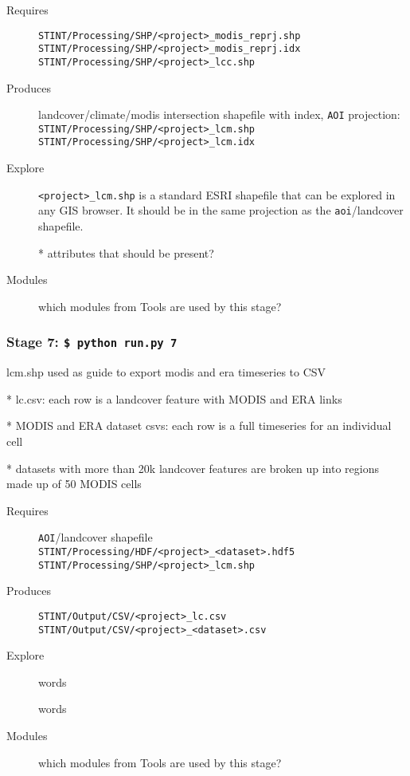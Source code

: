 \documentclass[twoside,a4paper]{refart}
\begin{document}
  \begin{description}
    \item [Requires]
      \texttt{STINT/Processing/SHP/<project>\_modis\_reprj.shp} \\
      \texttt{STINT/Processing/SHP/<project>\_modis\_reprj.idx} \\
      \texttt{STINT/Processing/SHP/<project>\_lcc.shp}
  
  
    \item [Produces]
      landcover/climate/modis intersection shapefile with index, 
      \texttt{AOI} projection:\\
      \texttt{STINT/Processing/SHP/<project>\_lcm.shp}\\
      \texttt{STINT/Processing/SHP/<project>\_lcm.idx}
      

    \item [Explore]
      \texttt{<project>\_lcm.shp} is a standard ESRI shapefile that can be explored in any GIS browser.  It should be in the same projection as the \texttt{aoi}/landcover shapefile.
      
      * attributes that should be present?

    \item [Modules]
      which modules from Tools are used by this stage?
  \end{description}


\subsubsection{\textbf{Stage 7:} \texttt{\$ python run.py 7}}
      lcm.shp used as guide to export modis and era timeseries to CSV
      
        * lc.csv: each row is a landcover feature with MODIS and ERA links
        
        * MODIS and ERA dataset csvs: each row is a full timeseries for an
          individual cell
          
        * datasets with more than 20k landcover features are broken up into
          regions made up of 50 MODIS cells

  \begin{description}
    \item [Requires]
      \texttt{AOI}/landcover shapefile \\
      \texttt{STINT/Processing/HDF/<project>\_<dataset>.hdf5} \\
      \texttt{STINT/Processing/SHP/<project>\_lcm.shp}
  
  
    \item [Produces]
      \texttt{STINT/Output/CSV/<project>\_lc.csv} \\
      \texttt{STINT/Output/CSV/<project>\_<dataset>.csv} \\
      

    \item [Explore]
      words
      
      words

    \item [Modules]
      which modules from Tools are used by this stage?
  \end{description}
\end{document}
